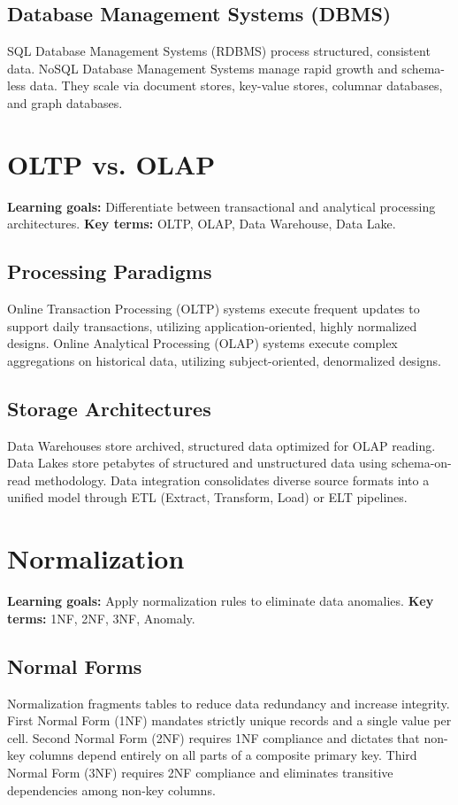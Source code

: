 \documentclass[12pt, a4paper]{article}
\begin{document}
\subsection{Database Management Systems (DBMS)}
SQL Database Management Systems (RDBMS) process structured, consistent data.
NoSQL Database Management Systems manage rapid growth and schema-less data. They scale via document stores, key-value stores, columnar databases, and graph databases.

\section{OLTP vs. OLAP}
\textbf{Learning goals:} Differentiate between transactional and analytical processing architectures.
\textbf{Key terms:} OLTP, OLAP, Data Warehouse, Data Lake.

\subsection{Processing Paradigms}
Online Transaction Processing (OLTP) systems execute frequent updates to support daily transactions, utilizing application-oriented, highly normalized designs.
Online Analytical Processing (OLAP) systems execute complex aggregations on historical data, utilizing subject-oriented, denormalized designs.

\subsection{Storage Architectures}
Data Warehouses store archived, structured data optimized for OLAP reading.
Data Lakes store petabytes of structured and unstructured data using schema-on-read methodology.
Data integration consolidates diverse source formats into a unified model through ETL (Extract, Transform, Load) or ELT pipelines.

\section{Normalization}
\textbf{Learning goals:} Apply normalization rules to eliminate data anomalies.
\textbf{Key terms:} 1NF, 2NF, 3NF, Anomaly.

\subsection{Normal Forms}
Normalization fragments tables to reduce data redundancy and increase integrity.
First Normal Form (1NF) mandates strictly unique records and a single value per cell.
Second Normal Form (2NF) requires 1NF compliance and dictates that non-key columns depend entirely on all parts of a composite primary key.
Third Normal Form (3NF) requires 2NF compliance and eliminates transitive dependencies among non-key columns.
\end{document}
